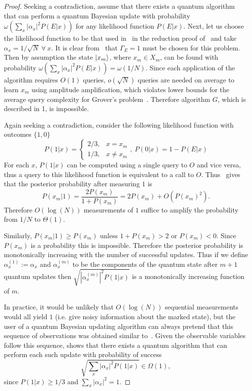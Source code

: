 \documentclass[aps,amsmath,onecolumn,amssymb,notitlepage]{revtex4-1}
\begin{document}
\begin{proof}
Seeking a contradiction, assume that there exists a quantum algorithm that can perform a quantum Bayesian update with probability $\omega({\sum_x |\alpha_x|^2 P(E|x)})$ for any likelihood function $P(E|x)$.  Next, let us choose the likelihood function to be that used in~ in the reduction proof of~ and take $\alpha_x =1/\sqrt{N}~\forall~x$.  It is clear from~ that $\Gamma_E =1$ must be chosen for this problem.  Then by assumption the state $\left|x_m\right\rangle$, where $x_m \in X_m$, can be found with probability $\omega({\sum_x |\alpha_x|^2 P(E|x)})= \omega(1/{N})$.  Since each application of the algorithm requires $O(1)$ queries, $o(\sqrt{N})$ queries are needed on average to learn $x_m$ using amplitude amplification, which violates lower bounds for the average query complexity for Grover's problem~\cite{BGH+96}.  Therefore algorithm $G$, which is described in 1, is impossible.


Again seeking a contradiction, consider the following likelihood function with outcomes $\{1,0\}$
\begin{equation}
P(1|x) = \begin{cases}
2/3, & x=x_m \\
1/3, & x\ne x_m
\end{cases},~P({0}|x) = 1-P(E|x)\label{eq:bayesgrover}
\end{equation}
For each $x$, $P(1|x)$ can be computed using a single query to $O$ and vice versa, thus a query to this likelihood function is equivalent to a call to $O$.
Thus~ gives that the posterior probability after measuring $1$ is
\begin{equation}
P(x_m|1)=\frac{2P(x_m)}{1 + P(x_m)}=2P(x_m) + O(P(x_m)^2).
\end{equation}
Therefore $O(\log(N))$ measurements of $1$ suffice to amplify the probability from $1/N$ to $\Theta(1)$.  

Similarly, $P(x_m|1) \ge P(x_m)$ unless $1+P(x_m) > 2$ or $P(x_m)<0$.  Since $P(x_m)$ is a probability this is impossible.  Therefore the posterior probability is monotonically increasing with the number of successful updates.  Thus if we define $\alpha^{(1)}_x:= \alpha_x$ and $\alpha_x^{(m)}$ to be the components of the quantum state after $m+1$ quantum updates then $\sqrt{|\alpha_x^{(m)}|^2 P(1|x)}$ is a  monotonically increasing function of $m$.

In practice, it would be unlikely that $O(\log(N))$ sequential measurements would all yield $1$ (i.e. give noisy information about the marked state), but the user of a quantum Bayesian updating algorithm can always pretend that this sequence of observations was obtained similar to~. 
Given the observable variables follow this sequence,  shows that 
there exists a quantum algorithm that can perform each such update with probability of success
\begin{equation}
\sqrt{\sum_x |\alpha_x|^2 P(1|x)} \in \Omega(1),\label{eq:Pfail}
\end{equation}
since $P(1|x) \ge 1/3$ and $\sum_x |\alpha_x|^2 =1$.


\end{proof}
\end{document}
